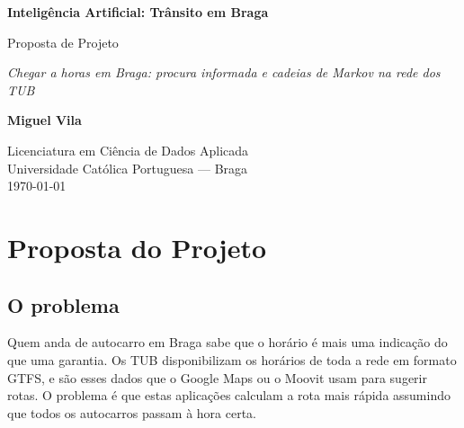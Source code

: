 \documentclass[11pt,a4paper]{article}
\newcommand{\tipodocumento}{Proposta de Projeto}   %
\begin{document}
\hypersetup{pageanchor=false}
\begin{titlepage}
  \centering
  \vspace*{\fill}

  {\LARGE\bfseries Inteligência Artificial: Trânsito em Braga\par}
  \vspace{1.2em}
  {\large \tipodocumento\par}
  \vspace{0.8em}
  {\large\itshape Chegar a horas em Braga: procura informada e cadeias de Markov na rede dos TUB\par}

  \vspace*{\fill}
  \vspace*{\fill}

  {\large\bfseries Miguel Vila\par}
  \vspace{0.6em}
  {\small Licenciatura em Ciência de Dados Aplicada\\
          Universidade Católica Portuguesa --- Braga\\[0.3em]
          \today\par}
  \vspace{2cm}
\end{titlepage}
\hypersetup{pageanchor=true}

\tableofcontents
\newpage

\section{Proposta do Projeto}
\label{sec:proposta}

\subsection{O problema}

Quem anda de autocarro em Braga sabe que o horário é mais uma indicação
do que uma garantia. Os TUB disponibilizam os horários de toda a rede em
formato GTFS, e são esses dados que o Google Maps ou o Moovit usam para
sugerir rotas. O problema é que estas aplicações calculam a rota mais
rápida assumindo que todos os autocarros passam à hora certa.
\end{document}
